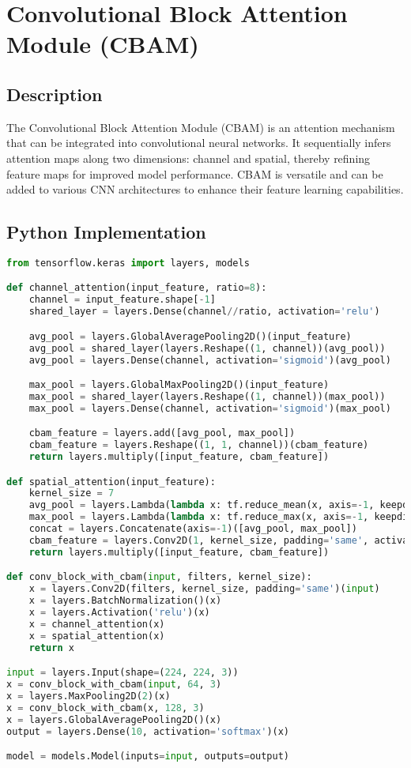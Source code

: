 \chapter{Convolutional Block Attention Module (CBAM)}

\section{Description}
The Convolutional Block Attention Module (CBAM) is an attention mechanism that can be integrated into convolutional neural networks. It sequentially infers attention maps along two dimensions: channel and spatial, thereby refining feature maps for improved model performance. CBAM is versatile and can be added to various CNN architectures to enhance their feature learning capabilities.

\section{Python Implementation}
\begin{lstlisting}[language=Python]
from tensorflow.keras import layers, models

def channel_attention(input_feature, ratio=8):
    channel = input_feature.shape[-1]
    shared_layer = layers.Dense(channel//ratio, activation='relu')

    avg_pool = layers.GlobalAveragePooling2D()(input_feature)
    avg_pool = shared_layer(layers.Reshape((1, channel))(avg_pool))
    avg_pool = layers.Dense(channel, activation='sigmoid')(avg_pool)

    max_pool = layers.GlobalMaxPooling2D()(input_feature)
    max_pool = shared_layer(layers.Reshape((1, channel))(max_pool))
    max_pool = layers.Dense(channel, activation='sigmoid')(max_pool)

    cbam_feature = layers.add([avg_pool, max_pool])
    cbam_feature = layers.Reshape((1, 1, channel))(cbam_feature)
    return layers.multiply([input_feature, cbam_feature])

def spatial_attention(input_feature):
    kernel_size = 7
    avg_pool = layers.Lambda(lambda x: tf.reduce_mean(x, axis=-1, keepdims=True))(input_feature)
    max_pool = layers.Lambda(lambda x: tf.reduce_max(x, axis=-1, keepdims=True))(input_feature)
    concat = layers.Concatenate(axis=-1)([avg_pool, max_pool])
    cbam_feature = layers.Conv2D(1, kernel_size, padding='same', activation='sigmoid')(concat)
    return layers.multiply([input_feature, cbam_feature])

def conv_block_with_cbam(input, filters, kernel_size):
    x = layers.Conv2D(filters, kernel_size, padding='same')(input)
    x = layers.BatchNormalization()(x)
    x = layers.Activation('relu')(x)
    x = channel_attention(x)
    x = spatial_attention(x)
    return x

input = layers.Input(shape=(224, 224, 3))
x = conv_block_with_cbam(input, 64, 3)
x = layers.MaxPooling2D(2)(x)
x = conv_block_with_cbam(x, 128, 3)
x = layers.GlobalAveragePooling2D()(x)
output = layers.Dense(10, activation='softmax')(x)

model = models.Model(inputs=input, outputs=output)
\end{lstlisting}

